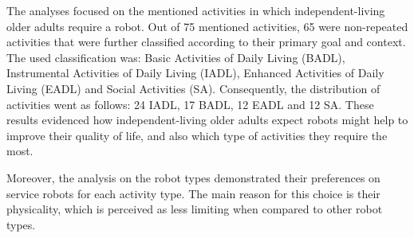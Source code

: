 The analyses focused on the mentioned activities in which independent-living older adults require a robot.
Out of 75 mentioned activities, 65 were non-repeated activities that were further classified according to their primary goal and context.
The used classification was: Basic Activities of Daily Living (BADL), Instrumental Activities of Daily Living (IADL), Enhanced Activities of Daily Living (EADL) and Social Activities (SA).
Consequently, the distribution of activities went as follows: 24 IADL, 17 BADL, 12 EADL and 12 SA.
These results evidenced how independent-living older adults expect robots might help to improve their quality of life, and also which type of activities they require the most.

Moreover, the analysis on the robot types demonstrated their preferences on service robots for each activity type. The main reason for this choice is their physicality, which is perceived as less limiting when compared to other robot types.

